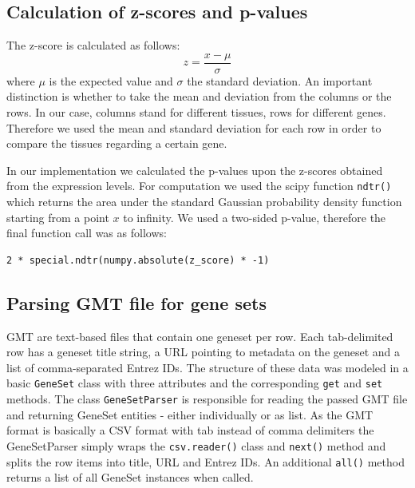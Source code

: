   \subsection[z-scores and p-values]{Calculation of z-scores and p-values}
      
  The z-score is calculated as follows:
  \begin{equation}
  z=\frac{x-\mu}{\sigma}
  \end{equation}
  where $\mu$ is the expected value and $\sigma$ the standard deviation. An
important distinction is whether to take the mean and deviation from the columns
or the rows. In our case, columns stand for different tissues, rows for
different genes. Therefore we used the mean and standard deviation for each row
in order to compare the tissues regarding a certain gene.
  
  In our implementation we calculated the p-values upon the z-scores obtained
from the expression levels. For computation we used the scipy function \lstinline|ndtr()|
which returns the area under the standard Gaussian probability density function
starting from a point $x$ to infinity. We used a two-sided p-value, therefore
the final function call was as follows:
  \lstset{language=Python}
\begin{lstlisting}
2 * special.ndtr(numpy.absolute(z_score) * -1)
\end{lstlisting}
  
  \subsection[GMT file parsing]{Parsing GMT file for gene sets}
  
  GMT are text-based files that contain one geneset per row. Each tab-delimited
row has a geneset title string, a URL pointing to metadata on the geneset and a
list of comma-separated Entrez IDs. The structure of these data was modeled in a
basic \lstinline|GeneSet| class with three attributes and the corresponding
\lstinline|get| and \lstinline|set| methods. The class \lstinline|GeneSetParser|
is responsible for reading the passed GMT file and returning GeneSet entities -
either individually or as list. As the GMT format is basically a CSV format with
tab instead of comma delimiters the GeneSetParser simply wraps the
\lstinline|csv.reader()| class and \lstinline|next()| method and splits the row
items into title, URL and Entrez IDs. An additional \lstinline|all()| method
returns a list of all GeneSet instances when called.
  
